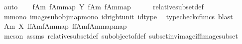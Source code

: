 \begin{isabellebody}
\ auto\isanewline
\isanewline
\ \ \isamarkupfalse%
\ {\isachardoublequoteopen}{\isacharparenleft}{\kern0pt}{\isacharparenleft}{\kern0pt}f{\isasymlparr}A{\isasymrparr}\isactrlbsub m\isactrlesub {\isacharcomma}{\kern0pt}\ {\isacharbrackleft}{\kern0pt}f{\isasymlparr}A{\isasymrparr}\isactrlbsub m\isactrlesub {\isacharbrackright}{\kern0pt}map{\isacharparenright}{\kern0pt}\ {\isasymsubseteq}\isactrlbsub Y\isactrlesub \ {\isacharparenleft}{\kern0pt}f{\isasymlparr}A{\isasymrparr}\isactrlbsub m\isactrlesub {\isacharcomma}{\kern0pt}\ {\isacharbrackleft}{\kern0pt}f{\isasymlparr}A{\isasymrparr}\isactrlbsub m\isactrlesub {\isacharbrackright}{\kern0pt}map{\isacharparenright}{\kern0pt}{\isacharparenright}{\kern0pt}{\isachardoublequoteclose}\isanewline
\ \ \ \ \isamarkupfalse%
\ relative{\isacharunderscore}{\kern0pt}subset{\isacharunderscore}{\kern0pt}def{}\isanewline
\ \ \ \ \isamarkupfalse%
\ m{\isacharunderscore}{\kern0pt}mono\ image{\isacharunderscore}{\kern0pt}subobj{\isacharunderscore}{\kern0pt}map{\isacharunderscore}{\kern0pt}mono\ id{\isacharunderscore}{\kern0pt}right{\isacharunderscore}{\kern0pt}unit{}\ id{\isacharunderscore}{\kern0pt}type\ \isamarkupfalse%
\ {\isacharparenleft}{\kern0pt}typecheck{\isacharunderscore}{\kern0pt}cfuncs{\isacharcomma}{\kern0pt}\ blast{\isacharparenright}{\kern0pt}\isanewline
\ \ \isamarkupfalse%
\ \isamarkupfalse%
\ {\isachardoublequoteopen}{\isacharparenleft}{\kern0pt}A{\isacharcomma}{\kern0pt}m{\isacharparenright}{\kern0pt}\ {\isasymsubseteq}\isactrlbsub X\isactrlesub \ {\isacharparenleft}{\kern0pt}f\isactrlsup {\isacharminus}{\kern0pt}f{\isasymlparr}A{\isasymrparr}\isactrlbsub m\isactrlesub {\isasymrparr}\isactrlbsub {\isacharbrackleft}{\kern0pt}f{\isasymlparr}A{\isasymrparr}\isactrlbsub m\isactrlesub {\isacharbrackright}{\kern0pt}map\isactrlesub {\isacharcomma}{\kern0pt}\ {\isacharbrackleft}{\kern0pt}f\isactrlsup {\isacharminus}{\kern0pt}f{\isasymlparr}A{\isasymrparr}\isactrlbsub m\isactrlesub {\isasymrparr}\isactrlbsub {\isacharbrackleft}{\kern0pt}f{\isasymlparr}A{\isasymrparr}\isactrlbsub m\isactrlesub {\isacharbrackright}{\kern0pt}map\isactrlesub {\isacharbrackright}{\kern0pt}map{\isacharparenright}{\kern0pt}{\isachardoublequoteclose}\isanewline
\ \ \ \ \isamarkupfalse%
\ {\isacharparenleft}{\kern0pt}meson\ assms\ relative{\isacharunderscore}{\kern0pt}subset{\isacharunderscore}{\kern0pt}def{}\ subobject{\isacharunderscore}{\kern0pt}of{\isacharunderscore}{\kern0pt}def{}\ subset{\isacharunderscore}{\kern0pt}inv{\isacharunderscore}{\kern0pt}image{\isacharunderscore}{\kern0pt}iff{\isacharunderscore}{\kern0pt}image{\isacharunderscore}{\kern0pt}subset{\isacharparenright}{\kern0pt}\isanewline

\end{isabellebody}
